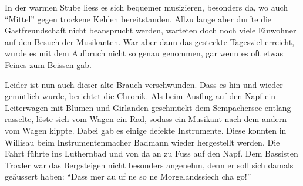 \begin{multicols}{2}
    In der warmen Stube liess es sich bequemer musizieren, besonders da, wo auch
    "`Mittel"' gegen trockene Kehlen bereitstanden. Allzu lange aber durfte die
    Gastfreundschaft nicht beansprucht werden, warteten doch noch viele
    Einwohner auf den Besuch der Musikanten. War aber dann das gesteckte
    Tagesziel erreicht, wurde es mit dem Aufbruch nicht so genau genommen, gar
    wenn es oft etwas Feines zum Beissen gab.

    Leider ist nun auch dieser alte Brauch verschwunden. Dass es hin und wieder
    gemütlich wurde, berichtet die Chronik. Als beim Ausflug auf den Napf ein
    Leiterwagen mit Blumen und Girlanden geschmückt dem Sempachersee entlang
    rasselte, löste sich vom Wagen ein Rad, sodass ein Musikant nach dem andern
    vom Wagen kippte. Dabei gab es einige defekte Instrumente. Diese konnten in
    Willisau beim Instrumentenmacher Badmann wieder hergestellt werden. Die
    Fahrt führte ins Luthernbad und von da an zu Fuss auf den Napf. Dem
    Bassisten Troxler war das Bergsteigen nicht besonders angenehm, denn er soll
    sich damals geäussert haben: "`Dass mer au uf ne so ne Morgelandssiech cha
    go!"'


\end{multicols}
